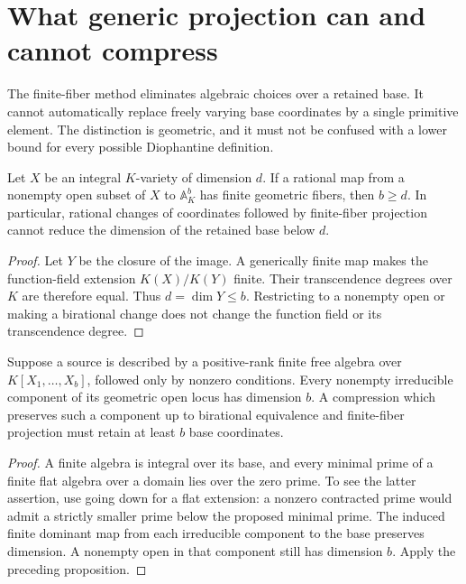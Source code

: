 \section{What generic projection can and cannot compress}
\label{p3sys:projection-limits}

The finite-fiber method eliminates algebraic choices over a retained
base.  It cannot automatically replace freely varying base coordinates
by a single primitive element.  The distinction is geometric, and
it must not be confused with a lower bound for every possible
Diophantine definition.

\begin{proposition}\label{p3sys:finite-projection-dimension}
Let $X$ be an integral $K$-variety of dimension $d$.  If a rational
map from a nonempty open subset of $X$ to $\mathbb A^b_K$ has
finite geometric fibers, then $b\ge d$.
In particular, rational changes of coordinates followed by finite-fiber
projection cannot reduce the dimension of the retained base below $d$.
\end{proposition}
\begin{proof}
Let $Y$ be the closure of the image.  A generically finite map makes
the function-field extension $K(X)/K(Y)$ finite.  Their transcendence
degrees over $K$ are therefore equal.  Thus
$d=\dim Y\le b$.  Restricting to a nonempty open or making a
birational change does not change the function field or its
transcendence degree.
\end{proof}

\begin{corollary}\label{p3sys:monic-base-barrier}
Suppose a source is described by a positive-rank finite free algebra
over $K[X_1,\ldots,X_b]$, followed only by nonzero conditions.
Every nonempty irreducible component of its geometric open locus
has dimension $b$.  A compression which preserves such a component
up to birational equivalence and finite-fiber projection must retain
at least $b$ base coordinates.
\end{corollary}
\begin{proof}
A finite algebra is integral over its base, and every minimal
prime of a finite flat algebra over a domain lies over the zero
prime.  To see the latter assertion, use going down for a flat
extension: a nonzero contracted prime would admit a strictly
smaller prime below the proposed minimal prime.  The induced
finite dominant map from each irreducible component to the
base preserves dimension.  A nonempty open in that component
still has dimension $b$.  Apply the preceding proposition.
\end{proof}


